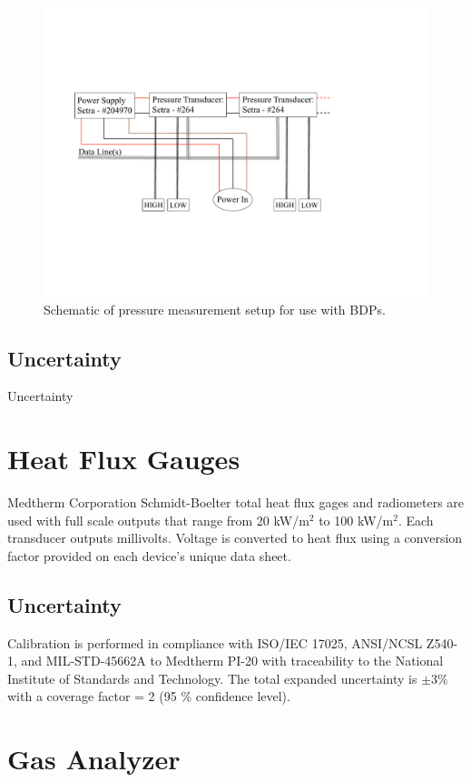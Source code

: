 \documentclass[11pt,oneside]{book}
\begin{document}
\begin{figure}[h!]
\includegraphics[width=5in]{Figures/BDP_Box}
\caption{Schematic of pressure measurement setup for use with BDPs.}
\label{fig:bdp_schem}
\end{figure}

\section{Uncertainty}

Uncertainty


\chapter{Heat Flux Gauges}

Medtherm Corporation Schmidt-Boelter total heat flux gages and radiometers are used with full scale outputs that range from 20 kW/m$^2$ to 100 kW/m$^2$. Each transducer outputs millivolts. Voltage is converted to heat flux using a conversion factor provided on each device's unique data sheet.

\section{Uncertainty}

Calibration is performed in compliance with ISO/IEC 17025, ANSI/NCSL Z540-1, and MIL-STD-45662A to Medtherm PI-20 with traceability to the National Institute of Standards and Technology. The total expanded uncertainty is $\pm 3\%$ with a coverage factor = 2 (95 $\%$ confidence level).


\chapter{Gas Analyzer}
\label{chap:Gas_Analyzer}
\end{document}
